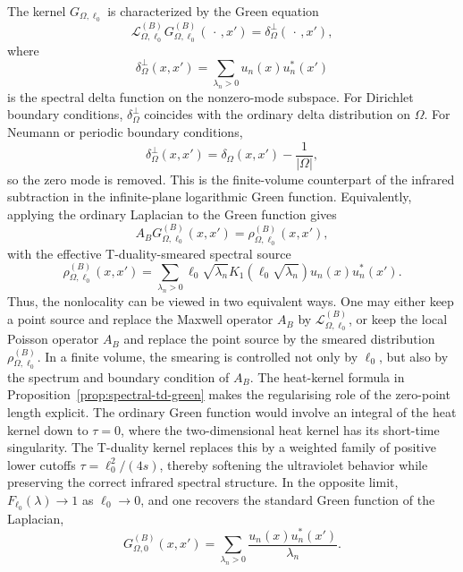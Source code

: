 \documentclass[openacc]{rsproca_new}%
\begin{document}
The kernel $G_{\Omega,\ell_0}$ is characterized by the Green equation
\begin{equation}
  \mathcal L_{\Omega,\ell_0}^{(B)}G_{\Omega,\ell_0}^{(B)}(\,\cdot\,,x')
  =\delta_\Omega^\perp(\,\cdot\,,x'),
\end{equation}
where
\begin{equation}
  \delta_\Omega^\perp(x,x')
  =\sum_{\lambda_n>0}u_n(x)u_n^*(x')
\end{equation}
is the spectral delta function on the nonzero-mode subspace. For Dirichlet boundary conditions, $\delta_\Omega^\perp$ coincides with the ordinary delta distribution on $\Omega$. For Neumann or periodic boundary conditions,
\begin{equation}
  \delta_\Omega^\perp(x,x')=\delta_\Omega(x,x')-\frac{1}{|\Omega|},
\end{equation}
so the zero mode is removed. This is the finite-volume counterpart of the infrared subtraction in the infinite-plane logarithmic Green function. Equivalently, applying the ordinary Laplacian to the Green function gives
\begin{equation}
  A_B G_{\Omega,\ell_0}^{(B)}(x,x')=\rho_{\Omega,\ell_0}^{(B)}(x,x'),
\end{equation}
with the effective T-duality-smeared spectral source
\begin{equation}
  \rho_{\Omega,\ell_0}^{(B)}(x,x')
  =\sum_{\lambda_n>0}
  \ell_0\sqrt{\lambda_n}K_1\!\left(\ell_0\sqrt{\lambda_n}\right)
  u_n(x)u_n^*(x').
\end{equation}
Thus, the nonlocality can be viewed in two equivalent ways. One may either keep a point source and replace the Maxwell operator $A_B$ by $\mathcal L_{\Omega,\ell_0}^{(B)}$, or keep the local Poisson operator $A_B$ and replace the point source by the smeared distribution $\rho_{\Omega,\ell_0}^{(B)}$. In a finite volume, the smearing is controlled not only by $\ell_0$, but also by the spectrum and boundary condition of $A_B$. The heat-kernel formula in Proposition~\ref{prop:spectral-td-green} makes the regularising role of the zero-point length explicit. The ordinary Green function would involve an integral of the heat kernel down to $\tau=0$, where the two-dimensional heat kernel has its short-time singularity. The T-duality kernel replaces this by a weighted family of positive lower cutoffs $\tau=\ell_0^2/(4s)$, thereby softening the ultraviolet behavior while preserving the correct infrared spectral structure. In the opposite limit, $F_{\ell_0}(\lambda)\to1$ as $\ell_0\to0$, and one recovers the standard Green function of the Laplacian,
\begin{equation}
  G_{\Omega,0}^{(B)}(x,x')
  =\sum_{\lambda_n>0}\frac{u_n(x)u_n^*(x')}{\lambda_n}.
\end{equation}
\end{document}
